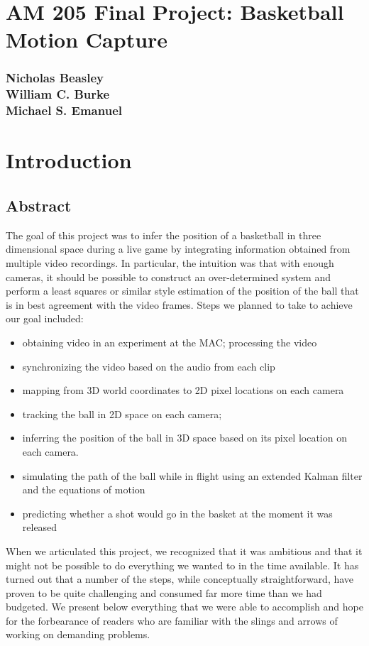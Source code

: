 \documentclass{article}
\begin{document}
\section*{AM 205 Final Project: Basketball Motion Capture}
\subsubsection*{
Nicholas Beasley\\
William C. Burke\\
Michael S. Emanuel}

\section{Introduction}
\subsection{Abstract}
The goal of this project was to infer the position of a basketball in three dimensional space during a live game by 
integrating information obtained from multiple video recordings.
In particular, the intuition was that with enough cameras, it should be possible to construct an over-determined system and perform 
a least squares or similar style estimation of the position of the ball that is in best agreement with the video frames.
Steps we planned to take to achieve our goal included:
\begin{itemize}
\item obtaining video in an experiment at the MAC; processing the video
\item synchronizing the video based on the audio from each clip
\item mapping from 3D world coordinates to 2D pixel locations on each camera
\item tracking the ball in 2D space on each camera; 
\item inferring the position of the ball in 3D space based on its pixel location on each camera.
\item simulating the path of the ball while in flight using an extended Kalman filter and the equations of motion
\item predicting whether a shot would go in the basket at the moment it was released
\end{itemize}

When we articulated this project, we recognized that it was ambitious and that it might not be possible to do everything we wanted to
in the time available.  It has turned out that a number of the steps, while conceptually straightforward, have proven to be quite
challenging and consumed far more time than we had budgeted.  We present below everything that we were able
to accomplish and hope for the forbearance of readers who are familiar with the slings and arrows of working on demanding problems.
\end{document}
